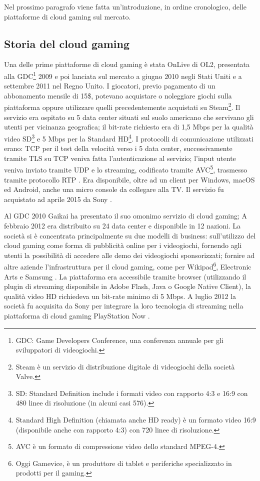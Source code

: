 Nel prossimo paragrafo viene fatta un'introduzione, in ordine cronologico, delle piattaforme di cloud gaming sul mercato.

\subsection{Storia del cloud gaming} \label{subsec:cap1_StoriaDelCloudGaming}
Una delle prime piattaforme di cloud gaming è stata OnLive di OL2, presentata alla GDC\footnote{GDC: Game Developers Conference, una conferenza annuale per gli sviluppatori di videogiochi.} 2009 e poi lanciata sul mercato a giugno 2010 negli Stati Uniti e a settembre 2011 nel Regno Unito. I giocatori, previo pagamento di un abbonamento mensile di 15\$, potevano acquistare o noleggiare giochi sulla piattaforma oppure utilizzare quelli precedentemente acquistati su Steam\footnote{Steam è un servizio di distribuzione digitale di videogiochi della società Valve.}. Il servizio era ospitato su 5 data center situati sul suolo americano che servivano gli utenti per vicinanza geografica; il bit-rate richiesto era di 1,5 Mbps per la qualità video SD\footnote{SD: Standard Definition include i formati video con rapporto 4:3 e 16:9 con 480 linee di risoluzione (in alcuni casi 576).} e 5 Mbps per la Standard HD\footnote{Standard High Definition (chiamata anche HD ready) è un formato video 16:9 (disponibile anche con rapporto 4:3) con 720 linee di risoluzione.}. I protocolli di comunicazione utilizzati erano: TCP per il test della velocità verso i 5 data center, successivamente tramite TLS su TCP veniva fatta l'autenticazione al servizio; l'input utente veniva inviato tramite UDP e lo streaming, codificato tramite AVC\footnote{AVC è un formato di compressione video dello standard MPEG-4.}, trasmesso tramite protocollo RTP \parencite{Dissecting_the_protocol_and_network_traffic_of_the_OnLive_cloud_gaming_platform}. Era disponibile, oltre ad un client per Windows, macOS ed Android, anche una micro console da collegare alla TV. Il servizio fu acquistato ad aprile 2015 da Sony \parencite{Cloud_gaming_history}.

Al GDC 2010 Gaikai ha presentato il suo omonimo servizio di cloud gaming; A febbraio 2012 era distribuito su 24 data center e disponibile in 12 nazioni. La società si è concentrata principalmente su due modelli di business: sull'utilizzo del cloud gaming come forma di pubblicità online per i videogiochi, fornendo agli utenti la possibilità di accedere alle demo dei videogiochi sponsorizzati; fornire ad altre aziende l'infrastruttura per il cloud gaming, come per Wikipad\footnote{Oggi Gamevice, è un produttore di tablet e periferiche specializzato in prodotti per il gaming.}, Electronic Arts e Samsung \parencite{Gaikai_open_platform}. La piattaforma era accessibile tramite browser (utilizzando il plugin di streaming disponibile in Adobe Flash, Java o Google Native Client), la qualità video HD richiedeva un bit-rate minimo di 5 Mbps. A luglio 2012 la società fu acquisita da Sony per integrare la loro tecnologia di streaming nella piattaforma di cloud gaming PlayStation Now \parencite{Gaikai_Beta}.

